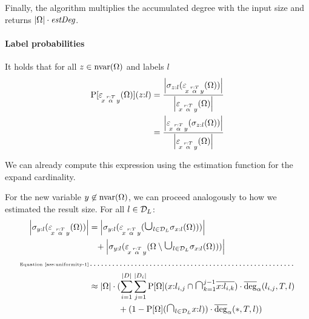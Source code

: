 Finally, the algorithm multiplies the accumulated degree with the input size
and returns ${\left \vert \Omega \right \vert} \cdot \textit{estDeg}$.

\endgroup

\paragraph{Label probabilities}

It holds that for all $z \in \textnormal{nvar}(\Omega)$ and labels $l$
\begin{align}
\begin{split}
  \operatorname{P}[\varepsilon\!_{x\, \overset{r:T}{\alpha} \, y}(\Omega)](z{:}l)
    &= \frac{{\left \vert \sigma_{z{:}l}(\varepsilon\!_{x\, \overset{r:T}{\alpha} \, y}(\Omega)) \right \vert}}
            {{\left \vert \varepsilon\!_{x\, \overset{r:T}{\alpha} \, y}(\Omega) \right \vert}} \\
    &= \frac{{\left \vert \varepsilon\!_{x\, \overset{r:T}{\alpha} \, y}(\sigma_{z{:}l}(\Omega)) \right \vert}}
            {{\left \vert \varepsilon\!_{x\, \overset{r:T}{\alpha} \, y}(\Omega) \right \vert}}
\end{split}
\end{align}

We can already compute this expression using the estimation function for
the expand cardinality.

For the new variable $y \not \in \textnormal{nvar}(\Omega)$, we can proceed analogously
to how we estimated the result size. For all $l \in \mathcal{D}_L$:
\begin{align}
\begin{split}
  \card{\selection{y:l}(\expandvar{x}{r:T}{\alpha}{y}(\Omega))}
    &= \card{\selection{y:l}(\expandvar{x}{r:T}{\alpha}{y}(
               \bigunion_{l \in \nlabels} \selection{x:l}(\Omega)))} \\
    &\phantom{=} + \card{\selection{y:l}(\expandvar{x}{r:T}{\alpha}{y}(
                 \Omega \setminus
                   \bigunion_{l \in \nlabels} \selection{x:l}(\Omega)))} \\
    \text{\tiny Equation \ref{ass:uniformity-1}} &\omit\dotfill \\
    &\approx
      \card{\Omega}
        \cdot (
          \sum_{i=1}^\card{\lpart}
          \sum_{j=1}^\card{\lpart_i}
            \prob{\Omega}(x{:}l_{i,j}
                          \isect \bigisect_{k=1}^{j-1} \overline{x{:}l_{i,k}})
              \cdot \avgdeg_\alpha(l_{i,j}, T, l) \\
     &\phantom{\approx\card{\Omega}\cdot(}
            + (1 - \prob{\Omega}(\bigisect_{l \in \nlabels} x{:}l))
              \cdot \avgdeg_\alpha(*, T, l)
      )
\end{split}
\end{align}

